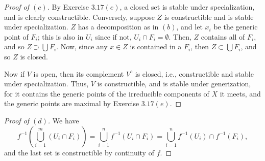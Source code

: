 \documentclass[10pt]{article}
\theoremstyle{definition}
\theoremstyle{remark}
\numberwithin{equation}{section}
\numberwithin{figure}{subsubsection}
\begin{document}
\begin{proof}[Proof of $(c)$]
  By Exercise $3.17(e)$, a closed set is stable under specialization, and is clearly constructible. Conversely, suppose $Z$ is constructible and is stable under specialization. $Z$ has a decomposition as in $(b)$, and let $x_i$ be the generic point of $F_i$; this is also in $U_i$ since if not, $U_i \cap F_i = \emptyset$. Then, $Z$ contains all of $F_i$, and so $Z \supset \bigcup F_i$. Now, since any $x \in Z$ is contained in a $F_i$, then $Z \subset \bigcup F_i$, and so $Z$ is closed.
  \par Now if $V$ is open, then its complement $V^c$ is closed, i.e., constructible and stable under specialization. Thus, $V$ is constructible, and is stable under generization, for it contains the generic points of the irreducible components of $X$ it meets, and the generic points are maximal by Exercise $3.17(e)$.
\end{proof}
\begin{proof}[Proof of $(d)$]
  We have
  \begin{equation*}
    f^{-1}\left( \bigcup_{i=1}^m (U_i \cap F_i) \right) = \bigcup_{i=1}^n f^{-1}(U_i \cap F_i) = \bigcup_{i=1}^n f^{-1}(U_i) \cap f^{-1}(F_i),
  \end{equation*}
  and the last set is constructible by continuity of $f$.
\end{proof}
\end{document}

